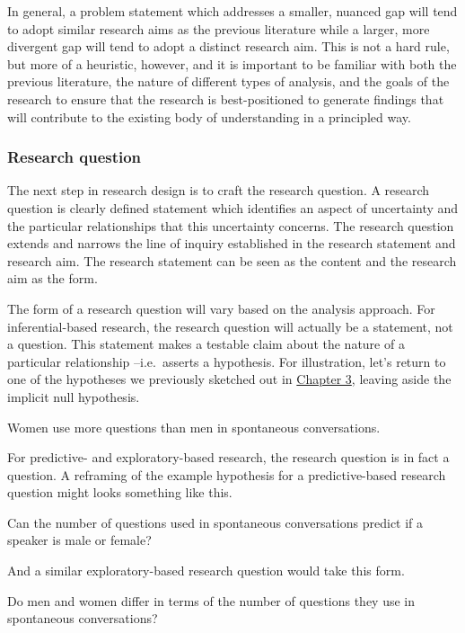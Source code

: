 \documentclass[
]{article}
\begin{document}
In general, a problem statement which addresses a smaller, nuanced gap will tend to adopt similar research aims as the previous literature while a larger, more divergent gap will tend to adopt a distinct research aim. This is not a hard rule, but more of a heuristic, however, and it is important to be familiar with both the previous literature, the nature of different types of analysis, and the goals of the research to ensure that the research is best-positioned to generate findings that will contribute to the existing body of understanding in a principled way.

\hypertarget{research-question}{%
\subsubsection{Research question}\label{research-question}}

The next step in research design is to craft the research question. A research question is clearly defined statement which identifies an aspect of uncertainty and the particular relationships that this uncertainty concerns. The research question extends and narrows the line of inquiry established in the research statement and research aim. The research statement can be seen as the content and the research aim as the form.

The form of a research question will vary based on the analysis approach. For inferential-based research, the research question will actually be a statement, not a question. This statement makes a testable claim about the nature of a particular relationship --i.e.~asserts a hypothesis. For illustration, let's return to one of the hypotheses we previously sketched out in \protect\hyperlink{approaching-analysis}{Chapter 3}, leaving aside the implicit null hypothesis.

Women use more questions than men in spontaneous conversations.

For predictive- and exploratory-based research, the research question is in fact a question. A reframing of the example hypothesis for a predictive-based research question might looks something like this.

Can the number of questions used in spontaneous conversations predict if a speaker is male or female?

And a similar exploratory-based research question would take this form.

Do men and women differ in terms of the number of questions they use in spontaneous conversations?
\end{document}
